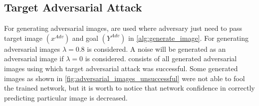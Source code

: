     \subsection*{Target Adversarial Attack}

        For generating adversarial images,  are used where  adversary just need to pass target image $(x^{Adv})$ and goal $(Y^{Adv})$ in \cref{alg:generate_image}. For generating adversarial images $\lambda = 0.8$ is considered. A noise will be generated as an adversarial image if $\lambda = 0$ is considered.  consists of all generated adversarial images using which target adversarial attack was successful. Some generated images as shown in \cref{fig:adversarial_images_unsuccessful} were not able to fool the trained network, but it is worth to notice that network confidence in correctly predicting particular image is decreased. 

